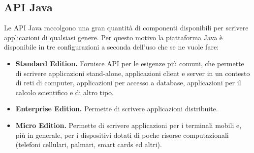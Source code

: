 \subsection*{API Java}
Le API Java raccolgono una gran quantit\`a di componenti disponibili per scrivere applicazioni di qualsiasi genere. Per questo motivo la piattaforma Java \`e disponibile in tre configurazioni a seconda dell'uso che se ne vuole fare:
\begin{itemize}
\item \textbf{Standard Edition.} Fornisce API per le esigenze pi\`u comuni, che permette di scrivere applicazioni stand-alone, applicazioni client e server in un contesto di reti di computer, applicazioni per accesso a database, applicazioni per il calcolo scientifico e di altro tipo.
\item \textbf{Enterprise Edition.} Permette di scrivere applicazioni distribuite.
\item \textbf{Micro Edition.} Permette di scrivere applicazioni per i terminali mobili e, pi\`u in generale, per i dispositivi dotati di poche risorse computazionali (telefoni cellulari, palmari, smart cards ed altri).
\end{itemize}
